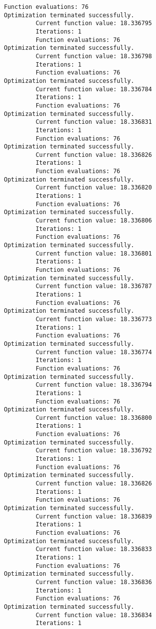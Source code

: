 \documentclass[11pt]{article}
\begin{document}
\begin{Verbatim}[commandchars=\\\{\}]
         Function evaluations: 76
Optimization terminated successfully.
         Current function value: 18.336795
         Iterations: 1
         Function evaluations: 76
Optimization terminated successfully.
         Current function value: 18.336798
         Iterations: 1
         Function evaluations: 76
Optimization terminated successfully.
         Current function value: 18.336784
         Iterations: 1
         Function evaluations: 76
Optimization terminated successfully.
         Current function value: 18.336831
         Iterations: 1
         Function evaluations: 76
Optimization terminated successfully.
         Current function value: 18.336826
         Iterations: 1
         Function evaluations: 76
Optimization terminated successfully.
         Current function value: 18.336820
         Iterations: 1
         Function evaluations: 76
Optimization terminated successfully.
         Current function value: 18.336806
         Iterations: 1
         Function evaluations: 76
Optimization terminated successfully.
         Current function value: 18.336801
         Iterations: 1
         Function evaluations: 76
Optimization terminated successfully.
         Current function value: 18.336787
         Iterations: 1
         Function evaluations: 76
Optimization terminated successfully.
         Current function value: 18.336773
         Iterations: 1
         Function evaluations: 76
Optimization terminated successfully.
         Current function value: 18.336774
         Iterations: 1
         Function evaluations: 76
Optimization terminated successfully.
         Current function value: 18.336794
         Iterations: 1
         Function evaluations: 76
Optimization terminated successfully.
         Current function value: 18.336800
         Iterations: 1
         Function evaluations: 76
Optimization terminated successfully.
         Current function value: 18.336792
         Iterations: 1
         Function evaluations: 76
Optimization terminated successfully.
         Current function value: 18.336826
         Iterations: 1
         Function evaluations: 76
Optimization terminated successfully.
         Current function value: 18.336839
         Iterations: 1
         Function evaluations: 76
Optimization terminated successfully.
         Current function value: 18.336833
         Iterations: 1
         Function evaluations: 76
Optimization terminated successfully.
         Current function value: 18.336836
         Iterations: 1
         Function evaluations: 76
Optimization terminated successfully.
         Current function value: 18.336834
         Iterations: 1

\end{Verbatim}
\end{document}
